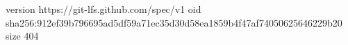 version https://git-lfs.github.com/spec/v1
oid sha256:912ef39b796695ad5df59a71ec35d30d58ea1859b4f47af74050625646229b20
size 404
